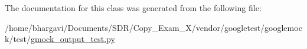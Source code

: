 The documentation for this class was generated from the following file\+:\begin{DoxyCompactItemize}
\item 
/home/bhargavi/\+Documents/\+S\+D\+R/\+Copy\+\_\+\+Exam\+\_\+X/vendor/googletest/googlemock/test/\hyperlink{gmock__output__test_8py}{gmock\+\_\+output\+\_\+test.\+py}\end{DoxyCompactItemize}
